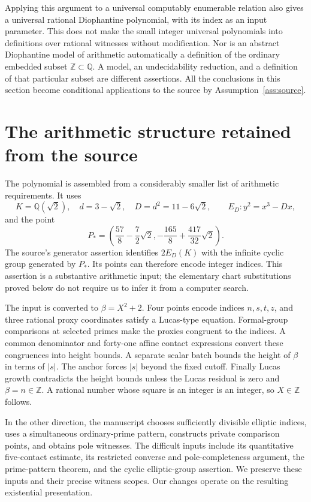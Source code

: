 \documentclass[11pt]{article}
\theoremstyle{definition}
\newcommand{\Q}{\mathbb Q}
\newcommand{\Z}{\mathbb Z}
\begin{document}
Applying this argument to a universal computably enumerable relation
also gives a universal rational Diophantine polynomial, with its index
as an input parameter. This does not make the small integer universal
polynomials into definitions over rational witnesses without modification.
Nor is an abstract Diophantine model of arithmetic automatically a
definition of the ordinary embedded subset $\Z\subset\Q$. A model,
an undecidability reduction, and a definition of that particular subset
are different assertions. All the conclusions in this section become
conditional applications to the source by
Assumption~\ref{ass:source}.

\section{The arithmetic structure retained from the source}
\label{sec:source-structure}

The polynomial is assembled from a considerably smaller list of
arithmetic requirements. It uses
\[
 K=\Q(\sqrt2),\quad d=3-\sqrt2,\quad D=d^2=11-6\sqrt2,
 \qquad E_D:y^2=x^3-Dx,
\]
and the point
\[
 P_*=\left(\frac{57}{8}-\frac72\sqrt2,
 -\frac{165}{8}+\frac{417}{32}\sqrt2\right).
\]
The source's generator assertion identifies $2E_D(K)$ with the
infinite cyclic group generated by $P_*$. Its points can therefore
encode integer indices. This assertion is a substantive arithmetic
input; the elementary chart substitutions proved below do not require
us to infer it from a computer search.

The input is converted to $\beta=X^2+2$. Four points encode indices
$n,s,t,z$, and three rational proxy coordinates satisfy a Lucas-type
equation. Formal-group comparisons at selected primes make the proxies
congruent to the indices. A common denominator and forty-one affine
contact expressions convert these congruences into height bounds.
A separate scalar batch bounds the height of $\beta$ in terms of
$|s|$. The anchor forces $|s|$ beyond the fixed cutoff. Finally Lucas
growth contradicts the height bounds unless the Lucas residual is zero
and $\beta=n\in\Z$. A rational number whose square is an integer
is an integer, so $X\in\Z$ follows.

In the other direction, the manuscript chooses sufficiently divisible
elliptic indices, uses a simultaneous ordinary-prime pattern, constructs
private comparison points, and obtains pole witnesses. The difficult
inputs include its quantitative five-contact estimate, its restricted
converse and pole-completeness argument, the prime-pattern theorem,
and the cyclic elliptic-group assertion. We preserve these inputs and
their precise witness scopes. Our changes operate on the resulting
existential presentation.
\end{document}
